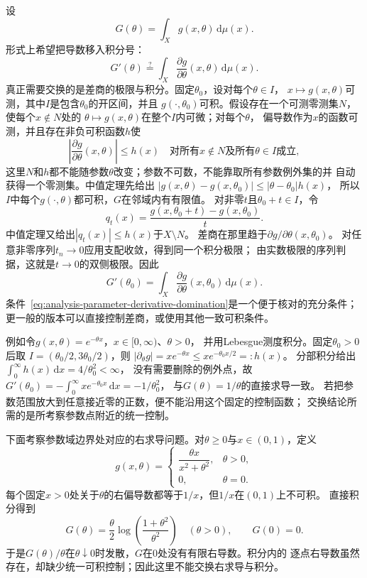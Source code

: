设
\[   G(\theta)=\int_X g(x,\theta)\,\mathrm{d}\mu(x). \]
形式上希望把导数移入积分号：
\[   G'(\theta)   \stackrel{?}{=}   \int_X\frac{\partial g}{\partial\theta}(x,\theta)\,\mathrm{d}\mu(x). \]
真正需要交换的是差商的极限与积分。固定$\theta_0$，设对每个$\theta\in I$，
$x\mapsto g(x,\theta)$可测，其中$I$是包含$\theta_0$的开区间，并且
$g(\cdot,\theta_0)$可积。假设存在一个可测零测集$N$，使每个$x\notin N$处的
$\theta\mapsto g(x,\theta)$在整个$I$内可微；对每个$\theta$，
偏导数作为$x$的函数可测，并且存在非负可积函数$h$使
\begin{equation}
  \left|
    \frac{\partial g}{\partial\theta}(x,\theta)
  \right|
  \leq h(x)
  \quad
  \text{对所有$x\notin N$及所有$\theta\in I$成立},
\label{eq:analysis-parameter-derivative-domination}
\end{equation}
这里$N$和$h$都不能随参数$\theta$改变；参数不可数，不能靠取所有参数例外集的并
自动获得一个零测集。中值定理先给出
$|g(x,\theta)-g(x,\theta_0)|\leq|\theta-\theta_0|h(x)$，
所以$I$中每个$g(\cdot,\theta)$都可积，$G$在邻域内有有限值。
对非零$t$且$\theta_0+t\in I$，令
\[
 q_t(x)=\frac{g(x,\theta_0+t)-g(x,\theta_0)}{t}.
\]
中值定理又给出$|q_t(x)|\leq h(x)$于$X\setminus N$。
差商在那里趋于$\partial g/\partial\theta(x,\theta_0)$。
对任意非零序列$t_n\to0$应用支配收敛，得到同一个积分极限；
由实数极限的序列判据，这就是$t\to0$的双侧极限。因此
\begin{equation}
  G'(\theta_0)
  =
  \int_X
  \frac{\partial g}{\partial\theta}(x,\theta_0)
  \,\mathrm{d}\mu(x).
\label{eq:analysis-differentiate-under-integral}
\end{equation}
条件~\eqref{eq:analysis-parameter-derivative-domination}是一个便于核对的充分条件； 更一般的版本可以直接控制差商，或使用其他一致可积条件。

例如令$g(x,\theta)=e^{-\theta x}$，$x\in[0,\infty)$、$\theta>0$，
并用Lebesgue测度积分。固定$\theta_0>0$后取
$I=(\theta_0/2,3\theta_0/2)$，则
$|\partial_\theta g|=xe^{-\theta x}\leq xe^{-\theta_0x/2}=:h(x)$。
分部积分给出$\int_0^\infty h(x)\,\mathrm dx=4/\theta_0^2<\infty$，
没有需要删除的例外点，故
$G'(\theta_0)=-\int_0^\infty xe^{-\theta_0x}\,\mathrm dx=-1/\theta_0^2$，
与$G(\theta)=1/\theta$的直接求导一致。
若把参数范围放大到任意接近零的正数，便不能沿用这个固定的控制函数；
交换结论所需的是所考察参数点附近的统一控制。

\begin{example}[参数积分中的控制函数失效]
\label{ex:analysis-parameter-integral-failure}
下面考察参数域边界处对应的右求导问题。对$\theta\geq0$与$x\in(0,1)$，定义
\[   g(x,\theta)   =
\begin{cases}     \dfrac{\theta x}{x^2+\theta^2}, & \theta>0,\\[5pt]     0, & \theta=0.
\end{cases} \]
每个固定$x>0$处关于$\theta$的右偏导数都等于$1/x$，但$1/x$在$(0,1)$上不可积。
直接积分得到
\[   G(\theta)   =   \frac{\theta}{2}   \log\left(\frac{1+\theta^2}{\theta^2}\right)   \quad(\theta>0),   \qquad G(0)=0. \]
于是$G(\theta)/\theta$在$\theta\downarrow0$时发散，$G$在$0$处没有有限右导数。积分内的
逐点右导数虽然存在，却缺少统一可积控制；因此这里不能交换右求导与积分。
\end{example}

